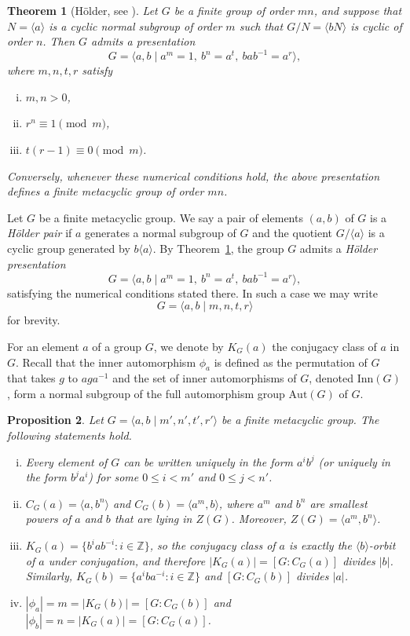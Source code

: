 \documentclass[a4paper,12pt]{article}
\newtheorem{thm}{Theorem}
\newtheorem{prop}[thm]{Proposition}
\theoremstyle{definition}
\theoremstyle{remark}
\begin{document}
\begin{thm}[Hölder, see {\cite[Theorem~21]{Zas99}}]\label{thm:hölder}
  Let $G$ be a finite group of order $mn$, and suppose that $N = \langle a\rangle$ is a cyclic normal subgroup of order $m$ such that $G/N = \langle bN\rangle$ is cyclic of order $n$. Then $G$ admits a presentation
  $$ G = \langle a,b \mid a^m = 1,\ b^n = a^t,\ bab^{-1} = a^r\rangle, $$
  where $m,n,t,r$ satisfy
  \begin{enumerate}[(i)]
  \item $m,n > 0$,
  \item $r^n\equiv 1 \pmod{m}$,
  \item $t(r-1)\equiv 0 \pmod{m}$.
  \end{enumerate}
  Conversely, whenever these numerical conditions hold, the above presentation defines a finite metacyclic group of order $mn$. 
\end{thm}

Let $G$ be a finite metacyclic group. We say a pair of elements $(a,b)$ of $G$ is a \emph{Hölder pair} if $a$ generates a normal subgroup of $G$ and the quotient $G/\langle a\rangle$ is a cyclic group generated by $b\langle a\rangle$. By Theorem~\ref{thm:hölder}, the group $G$ admits a \emph{Hölder presentation}
$$ G = \langle a,b \mid a^m = 1,\ b^n = a^t,\ bab^{-1} = a^r\rangle, $$
satisfying the numerical conditions stated there. In such a case we may write $$ G = \langle a,b\mid m,n,t,r\rangle $$ for brevity. %


For an element $a$ of a group $G$, we denote by $K_G(a)$ the conjugacy class of $a$ in $G$. Recall that the inner automorphism $\phi_a$ is defined as the permutation of $G$ that takes $g$ to $aga^{-1}$ and the set of inner automorphisms of $G$, denoted $\mathrm{Inn}(G)$, form a normal subgroup of the full automorphism group $\mathrm{Aut}(G)$ of $G$. 

\begin{prop}\label{prop:properties}
  Let $G = \langle a,b\mid m',n',t',r'\rangle$ be a finite metacyclic group. The following statements hold.
  \begin{enumerate}[(i)]
  \item Every element of $G$ can be written uniquely in the form $a^ib^j$ (or uniquely in the form $b^ja^i$) for some $0\leq i < m'$ and $0\leq j < n'$.
  \item $C_G(a) = \langle a,b^n\rangle$ and $C_G(b) = \langle a^m,b\rangle$, where $a^m$ and $b^n$ are smallest powers of $a$ and $b$ that are lying in $Z(G)$. Moreover, $Z(G) = \langle a^m,b^n\rangle$.
  \item $K_G(a) = \{b^iab^{-i}\colon i\in \mathbb{Z}\}$, so the conjugacy class of $a$ is exactly the $\langle b\rangle$-orbit of $a$ under conjugation, and therefore $|K_G(a)| = [G:C_G(a)]$ divides $|b|$. Similarly, $K_G(b) = \{a^iba^{-i}\colon i\in \mathbb{Z}\}$ and $[G:C_G(b)]$ divides $|a|$.
  \item $|\phi_a| = m = |K_G(b)| = [G:C_G(b)]$ and $|\phi_b| = n = |K_G(a)| = [G:C_G(a)]$.
  \end{enumerate}  
\end{prop}
\end{document}
